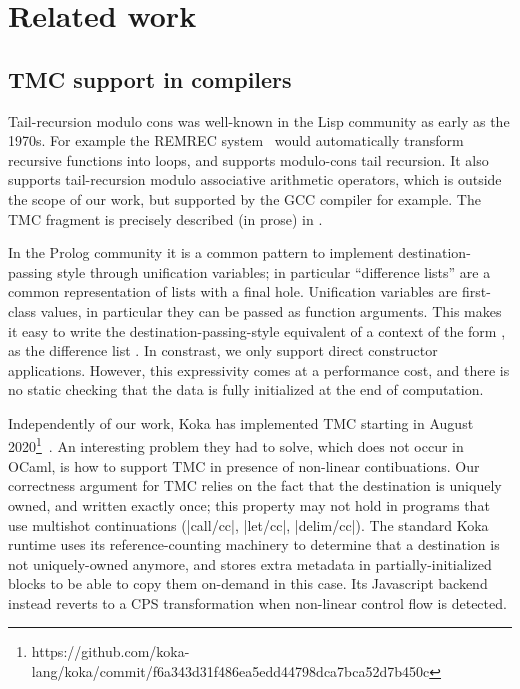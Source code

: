\section{Related work}

\subsection{TMC support in compilers}

Tail-recursion modulo cons was well-known in the Lisp community as
early as the 1970s. For example the REMREC system~\citep*{risch-73}
would automatically transform recursive functions into loops, and
supports modulo-cons tail recursion. It also supports tail-recursion
modulo associative arithmetic operators, which is outside the scope
of our work, but supported by the GCC compiler for example. The TMC
fragment is precisely described (in prose) in \citet*{friedman-wise-75}.

In the Prolog community it is a common pattern to implement
destination-passing style through unification variables; in particular
``difference lists'' are a common representation of lists with a final
hole. Unification variables are first-class values, in particular they
can be passed as function arguments. This makes it easy to write the
destination-passing-style equivalent of a context of the form
, as the difference list
. In constrast, we only support direct
constructor applications. However, this expressivity comes at
a performance cost, and there is no static checking that the data is
fully initialized at the end of computation.

Independently of our work, Koka has implemented TMC starting in August
2020\footnote{https://github.com/koka-lang/koka/commit/f6a343d31f486ea5edd44798dca7bca52d7b450c}~\citep*{tmc-koka-2023}.
An interesting problem they had to solve, which does not occur in OCaml,
is how to support TMC in presence of non-linear contibuations. Our
correctness argument for TMC relies on the fact that the destination
is uniquely owned, and written exactly once; this property may not
hold in programs that use multishot continuations (\ocaml|call/cc|,
\ocaml|let/cc|, \ocaml|delim/cc|). The standard Koka runtime uses its
reference-counting machinery to determine that a destination is not
uniquely-owned anymore, and stores extra metadata in
partially-initialized blocks to be able to copy them on-demand in this
case. Its Javascript backend instead reverts to a CPS transformation
when non-linear control flow is detected.


